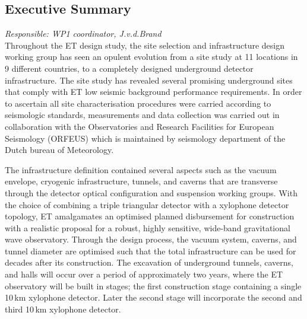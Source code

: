 \subsection{Executive Summary}
%
%
\emph{
Responsible:  WP1 coordinator, J.v.d.Brand  \\
}
Throughout the ET design study, the site selection and infrastructure design working group has seen an opulent evolution from a site study at 11 locations in 9 different countries, to a completely designed underground detector infrastructure. The site study has revealed several promising underground sites that comply with ET low seismic background performance requirements. In order to ascertain all site characterisation procedures were carried according to seismologic standards, measurements and data collection was carried out in collaboration with the Observatories and Research Facilities for European Seismology (ORFEUS) which is maintained by seismology department of the Dutch bureau of Meteorology. 


The infrastructure definition contained several aspects such as the vacuum envelope, cryogenic infrastructure, tunnels, and caverns that are transverse through the detector optical configuration and suspension working groups. With the choice of combining a triple triangular detector with a xylophone detector topology, ET amalgamates an optimised planned disbursement for construction with a realistic proposal for a robust, highly sensitive, wide-band gravitational wave observatory. Through the design process, the vacuum system, caverns, and tunnel diameter are optimised such that the total infrastructure can be used for decades after its construction. The excavation of underground tunnels, caverns, and halls will occur over a period of approximately two years, where the ET observatory will be built in stages; the first construction stage containing a single 10\,km xylophone detector. Later the second stage will incorporate the second and third 10\,km xylophone detector.



